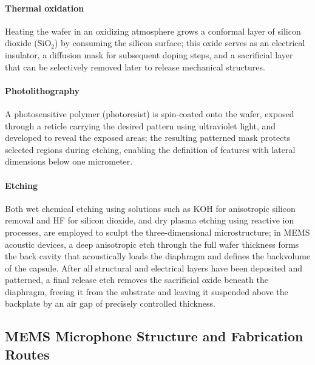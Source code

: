 \paragraph{Thermal oxidation} Heating the wafer in an oxidizing atmosphere grows a conformal layer of silicon dioxide (\(\mathrm{SiO_2}\)) by consuming the silicon surface; this oxide serves as an electrical insulator, a diffusion mask for subsequent doping steps, and a sacrificial layer that can be selectively removed later to release mechanical structures.

\paragraph{Photolithography} A photosensitive polymer (photoresist) is spin-coated onto the wafer, exposed through a reticle carrying the desired pattern using ultraviolet light, and developed to reveal the exposed areas; the resulting patterned mask protects selected regions during etching, enabling the definition of features with lateral dimensions below one micrometer.

\paragraph{Etching} Both wet chemical etching using solutions such as KOH for anisotropic silicon removal and HF for silicon dioxide, and dry plasma etching using reactive ion processes, are employed to sculpt the three-dimensional microstructure; in MEMS acoustic devices, a deep anisotropic etch through the full wafer thickness forms the back cavity that acoustically loads the diaphragm and defines the backvolume of the capsule.
After all structural and electrical layers have been deposited and patterned, a final release etch removes the sacrificial oxide beneath the diaphragm, freeing it from the substrate and leaving it suspended above the backplate by an air gap of precisely controlled thickness.

\subsection{MEMS Microphone Structure and Fabrication Routes}


